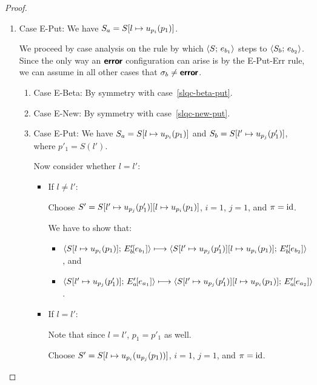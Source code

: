 \begin{proof}
\begin{enumerate}
\begin{enumerate}
    \end{enumerate}
  \item Case {\sc E-Put}: We have $S_a =
    S[l \mapsto u_{p_i}(p_1)]$.

    We proceed by case analysis on the rule by which
    $\langle S;\, e_{b_1} \rangle$ steps to $\langle S_b;\, e_{b_2} \rangle$.  Since the
    only way an $\textbf{\textsf{error}}$ configuration can arise is by the {\sc
      E-Put-Err} rule, we can assume in all other cases that $\sigma_b
    \neq \textbf{\textsf{error}}$.
    \begin{enumerate}
    \item \label{slqc-put-beta}Case {\sc E-Beta}: By symmetry with case~\ref{slqc-beta-put}.
    \item \label{slqc-put-new}Case {\sc E-New}: By symmetry with case~\ref{slqc-new-put}.
    \item \label{slqc-put-put}Case {\sc E-Put}: We have $S_a =
      S[l \mapsto u_{p_i}(p_1)]$ and $S_b =
      S[l' \mapsto u_{p_j}(p'_1)]$, where $p'_1 = S(l')$.

      Now consider whether $l = l'$:
      \begin{itemize}
        \item If $l \neq l'$:

          Choose $S' =
          S[l' \mapsto u_{p_j}(p'_1)][l \mapsto u_{p_i}(p_1)]$,
          $i = 1$, $j = 1$, and $\pi = \mathrm{id}$.

          We have to show that:
          \begin{itemize}
          \item
            $\langle S[l \mapsto u_{p_i}(p_1)];\, E'_b\hspace{-1mm}\left[e_{b_1}\right] \rangle
            \longmapsto
            \langle S[l' \mapsto u_{p_j}(p'_1)][l \mapsto u_{p_i}(p_1)];\, E'_b\hspace{-1mm}\left[e_{b_2}\right] \rangle$,
            and
          \item
            $\langle S[l' \mapsto u_{p_j}(p'_1)];\, E'_a\hspace{-1mm}\left[e_{a_1}\right] \rangle
            \longmapsto
            \langle S[l' \mapsto u_{p_j}(p'_1)][l \mapsto u_{p_i}(p_1)];\, E'_a\hspace{-1mm}\left[e_{a_2}\right] \rangle$.
          \end{itemize}
          \TODO{}

        \item If $l = l'$:

          Note that since $l = l'$, $p_1 = p'_1$ as well.

          Choose $S' = S[l \mapsto u_{p_i}(u_{p_j}(p_1))]$, $i =
          1$, $j = 1$, and $\pi = \mathrm{id}$.


\end{itemize}
\end{enumerate}
\end{enumerate}
\end{proof}
